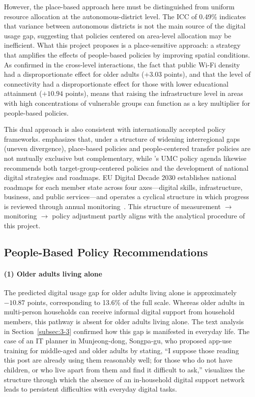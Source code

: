 However, the place-based approach here must be distinguished from uniform resource allocation at the autonomous-district level. The ICC of 0.49\% indicates that variance between autonomous districts is not the main source of the digital usage gap, suggesting that policies centered on area-level allocation may be inefficient. What this project proposes is a place-sensitive approach: a strategy that amplifies the effects of people-based policies by improving spatial conditions. As confirmed in the cross-level interactions, the fact that public Wi-Fi density had a disproportionate effect for older adults ($+3.03$ points), and that the level of connectivity had a disproportionate effect for those with lower educational attainment ($+10.94$ points), means that raising the infrastructure level in areas with high concentrations of vulnerable groups can function as a key multiplier for people-based policies.

This dual approach is also consistent with internationally accepted policy frameworks. \citet{OECD2025} emphasizes that, under a structure of widening interregional gaps (uneven divergence), place-based policies and people-centered transfer policies are not mutually exclusive but complementary, while \citet{ITU2024}'s UMC policy agenda likewise recommends both target-group-centered policies and the development of national digital strategies and roadmaps. EU Digital Decade 2030 establishes national roadmaps for each member state across four axes---digital skills, infrastructure, business, and public services---and operates a cyclical structure in which progress is reviewed through annual monitoring~\citep{EuropeanCommission2025}. This structure of measurement $\rightarrow$ monitoring $\rightarrow$ policy adjustment partly aligns with the analytical procedure of this project.

\subsection{People-Based Policy Recommendations}
\label{subsec:4-2}

\paragraph{(1) Older adults living alone}

The predicted digital usage gap for older adults living alone is approximately $-10.87$ points, corresponding to 13.6\% of the full scale. Whereas older adults in multi-person households can receive informal digital support from household members, this pathway is absent for older adults living alone. The text analysis in Section~\ref{subsec:3-3} confirmed how this gap is manifested in everyday life. The case of an IT planner in Munjeong-dong, Songpa-gu, who proposed app-use training for middle-aged and older adults by stating, ``I suppose those reading this post are already using them reasonably well; for those who do not have children, or who live apart from them and find it difficult to ask,'' visualizes the structure through which the absence of an in-household digital support network leads to persistent difficulties with everyday digital tasks.

